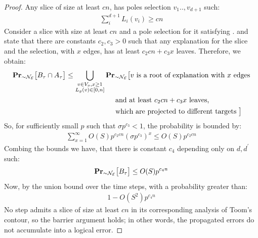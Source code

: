 \begin{proof}
Any slice of size at least $cn$, has poles selection $v_{1}..,v_{d+1}$ such: 
\begin{equation}
  \begin{split}
    \label{equ:bigspan}
  \sum_{i}^{d+1}L_{i}(v_{i}) \ge cn
  \end{split}
\end{equation}
Consider a slice with size at least $cn$ and a pole selection for it satisfying .  and  state that there are constants $c_{2},c_{3} > 0$ such that any explanation for the slice and the selection, with $x$ edges, has at least $c_{2} cn + c_{3} x$ leaves. Therefore, we obtain:
    \begin{equation*}
      \begin{split}
        \prbm{  B_{\tau}  \cap A_{\tau}  }{ \sim \mathcal{N}_{\mathcal{E}} } & \le \bigcup_{ \substack{ v \in V_{o}, x \ge 1 \\ L_{g}(v) \in [0,n]} } \prbm{ v \text{ is a root of explanation with } x \text{ edges} \\ 
      & \ \ \ \ \ \ \ \ \ \ \ \ \ \ \ \  \ \  \ \ \text{ and at least } c_{2}cn + c_{3}x \text{ leaves, } \\
  & \ \ \ \ \ \ \ \ \ \ \ \ \ \ \ \  \ \  \ \ \text{ which are projected to different targets  }  }{ \sim \mathcal{N}_{\mathcal{E}} } 
            \end{split}
          \end{equation*}
          So, for sufficiently small $p$ such that $\sigma p^{c_{3}} < 1$, the probability is bounded by:
          \begin{equation*}
            \begin{split}
              \sum_{x = 1  }^{ \infty } O(S)p^{c_{2}cn} \left( \sigma p^{c_{3} } \right)^{x}  \le O(S) p^{c_{2}c n} 
      \end{split}
    \end{equation*}
    Combing the bounds we have, that there is constant $c_{4}$ depending only on  $d,d^{\prime}$ such:
\begin{equation*}
  \begin{split}
    \prbm{  B_{\tau} }{ \sim \mathcal{N}_{\mathcal{E}} } \le  O(S) p^{c_{4} n} 
  \end{split}
\end{equation*}
Now, by the union bound over the time steps, with a probability greater than:
\begin{equation*}
  \begin{split}
  1 -   O \left( S^{2} \right) p^{ c_{4}n } 
  \end{split}
\end{equation*}
No step admits a slice of size at least $cn$ in its corresponding analysis of Toom's contour, so the barrier argument holds; in other words, the propagated errors do not accumulate into a logical error.
\end{proof}
